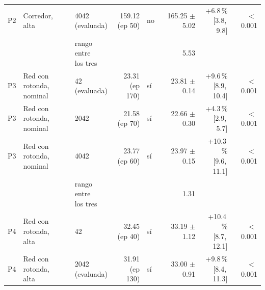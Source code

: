 \begin{table}[H]
\begin{tabular}{lllrlrrr}
P2 & \makecell[l]{Corredor,\\{}alta} & \makecell[l]{4042\\{}(evaluada)} & \makecell[r]{159.12\\{}(ep 50)} & no & \makecell[r]{165.25\\{}$\pm$ 5.02} & \makecell[r]{+6.8\,\%\\{}[3.8,\,9.8]} & $<$\,0.001 \\
 & & \makecell[l]{rango entre\\{}los tres} & & & 5.53 & & \\
P3 & \makecell[l]{Red con rotonda,\\{}nominal} & \makecell[l]{42\\{}(evaluada)} & \makecell[r]{23.31\\{}(ep 170)} & sí & \makecell[r]{23.81\\{}$\pm$ 0.14} & \makecell[r]{+9.6\,\%\\{}[8.9,\,10.4]} & $<$\,0.001 \\
P3 & \makecell[l]{Red con rotonda,\\{}nominal} & 2042 & \makecell[r]{21.58\\{}(ep 70)} & sí & \makecell[r]{22.66\\{}$\pm$ 0.30} & \makecell[r]{+4.3\,\%\\{}[2.9,\,5.7]} & $<$\,0.001 \\
P3 & \makecell[l]{Red con rotonda,\\{}nominal} & 4042 & \makecell[r]{23.77\\{}(ep 60)} & sí & \makecell[r]{23.97\\{}$\pm$ 0.15} & \makecell[r]{+10.3\,\%\\{}[9.6,\,11.1]} & $<$\,0.001 \\
 & & \makecell[l]{rango entre\\{}los tres} & & & 1.31 & & \\
P4 & \makecell[l]{Red con rotonda,\\{}alta} & 42 & \makecell[r]{32.45\\{}(ep 40)} & sí & \makecell[r]{33.19\\{}$\pm$ 1.12} & \makecell[r]{+10.4\,\%\\{}[8.7,\,12.1]} & $<$\,0.001 \\
P4 & \makecell[l]{Red con rotonda,\\{}alta} & \makecell[l]{2042\\{}(evaluada)} & \makecell[r]{31.91\\{}(ep 130)} & sí & \makecell[r]{33.00\\{}$\pm$ 0.91} & \makecell[r]{+9.8\,\%\\{}[8.4,\,11.3]} & $<$\,0.001 \\

\end{tabular}
\end{table}
